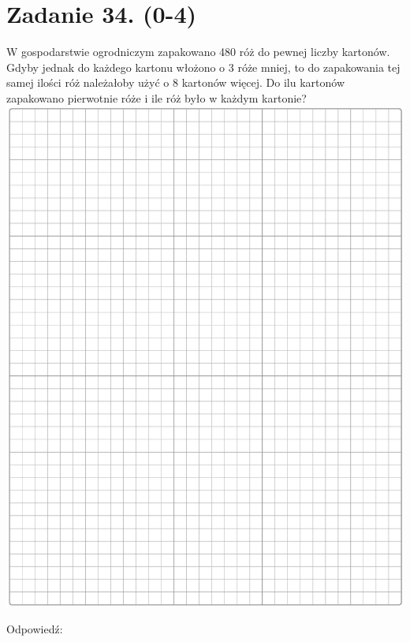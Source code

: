 \documentclass[10pt]{article}
\begin{document}
\section*{Zadanie 34. (0-4)}
W gospodarstwie ogrodniczym zapakowano 480 róż do pewnej liczby kartonów. Gdyby jednak do każdego kartonu włożono o 3 róże mniej, to do zapakowania tej samej ilości róż należałoby użyć o 8 kartonów więcej. Do ilu kartonów zapakowano pierwotnie róże i ile róż było w każdym kartonie?\\
\includegraphics[max width=\textwidth, center]{2024_11_21_e15da647cf0a41077ac3g-14}

Odpowiedź: \(\qquad\)
\end{document}
